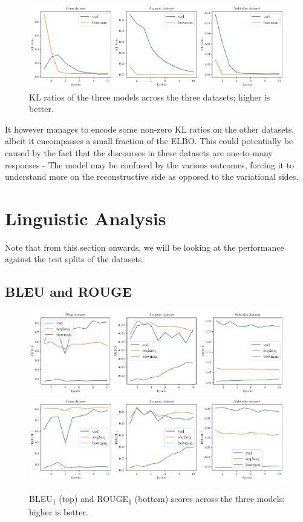 \documentclass[12pt,twoside]{report}
\begin{document}
\begin{figure}[!ht]
	\centering
	\includegraphics[width=150mm]{results/kl_ratio.pdf}
	\caption{KL ratios of the three models across the three datasets; higher is better.\label{r:kl_ratio}}
	\end{figure}

It however manages to encode some non-zero KL ratios on the other datasets, albeit it encompasses a small fraction of the ELBO. This could potentially be caused by the fact that the discourses in these datasets are one-to-many responses - The model may be confused by the various outcomes, forcing it to understand more on the reconstructive side as opposed to the variational sides.

\section{Linguistic Analysis}
Note that from this section onwards, we will be looking at the performance against the test splits of the datasets. 

\subsection{BLEU and ROUGE}
\begin{figure}[!ht]
	\centering
	\includegraphics[width=150mm]{results/bleu1.pdf}
	\includegraphics[width=150mm]{results/rouge_1.pdf}
	\caption{BLEU\textsubscript{1} (top) and ROUGE\textsubscript{1} (bottom) scores across the three models; higher is better.\label{r:bleu_rouge}}
  \end{figure}
\end{document}
